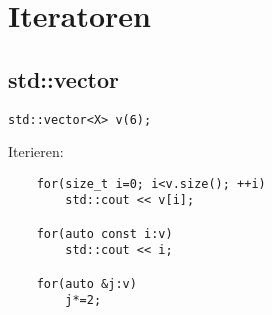 \section{Iteratoren}
\subsection{std::vector}
\begin{lstlisting}
std::vector<X> v(6);
\end{lstlisting}
Iterieren:
\begin{lstlisting}
	for(size_t i=0; i<v.size(); ++i)
		std::cout << v[i];
	
	for(auto const i:v)
		std::cout << i;
	
	for(auto &j:v)
		j*=2;
\end{lstlisting}


